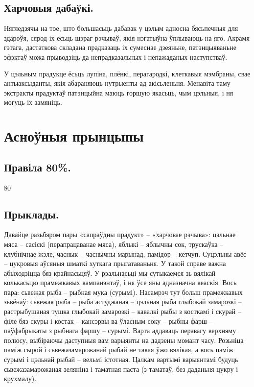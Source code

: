 \subsection{Харчовыя дабаўкі.}
Нягледзячы на тое, што большасьць дабавак у цэлым адносна бясьпечныя для здароўя, сярод іх ёсьць шэраг рэчываў, якія нэгатыўна ўплываюць на яго. Акрамя гэтага, дастаткова складана прадказаць іх сумеснае дзеяньне, патэнцыяваньне эфэктаў можа прыводзіць да непрадказальных і непажаданых наступстваў.

У цэльным прадукце ёсьць лупіна, плёнкі, перагародкі, клеткавыя мэмбраны, свае антыаксыданты, якія абараняюць нутрыенты ад акісьленьня. Менавіта таму экстракты прадуктаў патэнцыйна маюць горшую якасьць, чым цэльныя, і ня могуць іх замяніць.

\section{Асноўныя прынцыпы}

\subsection{Правіла 80\%.}
80%

\subsection{Прыклады.}
Давайце разьбяром пары «сапраўдны прадукт» – «харчовае рэчыва»: цэльнае мяса – сасіскі (перапрацаванае мяса), яблыкі – яблычны сок, трускаўка – клубнічнае жэле, часнык – часнычны марынад, памідор – кетчуп. Суцэльны авёс – цукровыя аўсяныя шматкі хуткага прыгатаваньня. У такой справе важна абыходзіцца бяз крайнасьцяў. У рэальнасьці мы сутыкаемся зь вялікай колькасьцю прамежкавых кампанэнтаў, і ня ўсе яны адназначна кеаскія. Вось пара: сьвежая рыба – рыбная мука (сурымі). Насамрэч тут больш прамежкавых зьвёнаў: сьвежая рыба – рыба астуджаная – цэльная рыба глыбокай замарозкі – растрыбушаная тушка глыбокай замарозкі – кавалкі рыбы з косткамі і скурай – філе бяз скуры і костак – кансэрвы ва ўласным соку – рыбны фарш – паўфабрыкаты з рыбнага фаршу – сурымі. Варта аддаваць перавагу верхняму полюсу, выбіраючы даступныя вам варыянты на дадзены момант часу. Розьніца паміж сырой і сьвежазамарожанай рыбай не такая ўжо вялікая, а вось паміж сурымі і цэльнай рыбай – вельмі істотная. Цалкам вартымі варыянтамі будуць сьвежазамарожаная зеляніна і таматная паста (з таматаў, без даданьня цукру і крухмалу).


